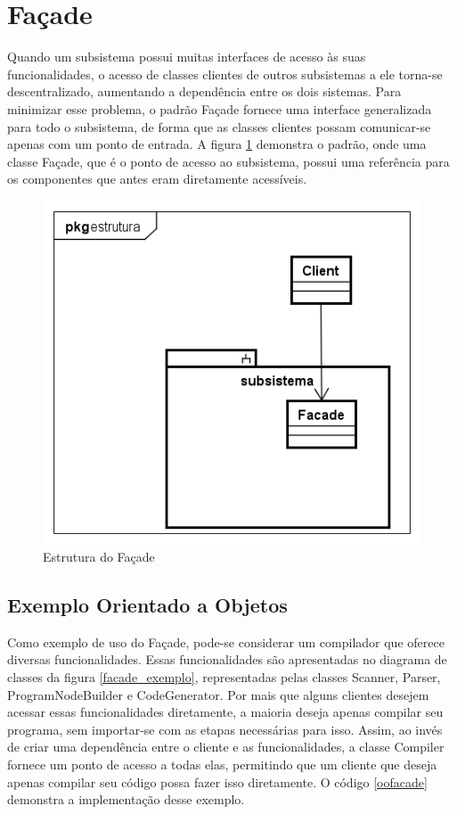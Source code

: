 \section{Façade}

Quando um subsistema possui muitas interfaces 
de acesso às suas funcionalidades, o acesso de 
classes clientes de outros subsistemas a ele 
torna-se descentralizado, aumentando a dependência 
entre os dois sistemas. Para minimizar esse problema, 
o padrão Façade fornece uma interface generalizada 
para todo o subsistema, de forma que as classes 
clientes possam comunicar-se apenas com um ponto 
de entrada. A figura \ref{facade_struct} demonstra 
o padrão, onde uma classe Façade, que é o ponto de 
acesso ao subsistema, possui uma referência para 
os componentes que antes eram diretamente acessíveis.

\begin{figure}[htb]
	\caption{\label{facade_struct}Estrutura do Façade}
	\begin{center}
	    \includegraphics[scale=0.4]{5_padroes-contexto-funcional/5.2_estruturais/5.2.5_facade/facade_estrutura.png}
	\end{center}
\end{figure}

\subsection*{Exemplo Orientado a Objetos}

Como exemplo de uso do Façade, pode-se considerar 
um compilador que oferece diversas funcionalidades. 
Essas funcionalidades são apresentadas no diagrama 
de classes da figura \ref{facade_exemplo}, representadas 
pelas classes Scanner, Parser, ProgramNodeBuilder e 
CodeGenerator. Por mais que alguns clientes desejem 
acessar essas funcionalidades diretamente, a maioria 
deseja apenas compilar seu programa, sem importar-se 
com as etapas necessárias para isso. Assim, ao invés de 
criar uma dependência entre o cliente e as 
funcionalidades, a classe Compiler fornece um ponto 
de acesso a todas elas, permitindo que um cliente 
que deseja apenas compilar seu código possa fazer 
isso diretamente. O código \ref{oofacade} demonstra 
a implementação desse exemplo.

